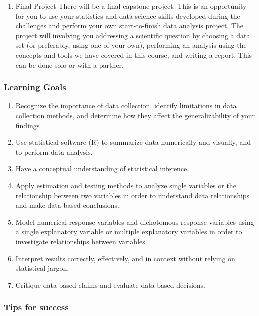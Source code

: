 \documentclass[]{book}
\providecommand{\tightlist}{%
  \setlength{\itemsep}{0pt}\setlength{\parskip}{0pt}}
\theoremstyle{definition}
\theoremstyle{definition}
\theoremstyle{definition}
\theoremstyle{remark}
\begin{document}
\begin{enumerate}
\def\labelenumi{\arabic{enumi}.}
\setcounter{enumi}{3}
\tightlist
\item
  Final Project There will be a final capstone project. This is an
  opportunity for you to use your statistics and data science skills
  developed during the challenges and perform your own start-to-finish
  data analysis project. The project will involving you addressing a
  scientific question by choosing a data set (or preferably, using one
  of your own), performing an analysis using the concepts and tools we
  have covered in this course, and writing a report. This can be done
  solo or with a partner. 
\end{enumerate}

\hypertarget{learning-goals}{%
\subsubsection{Learning Goals}\label{learning-goals}}

\begin{enumerate}
\def\labelenumi{\arabic{enumi}.}
\tightlist
\item
  Recognize the importance of data collection, identify limitations in
  data collection methods, and determine how they affect the
  generalizability of your findings
\item
  Use statistical software (R) to summarize data numerically and
  visually, and to perform data analysis.
\item
  Have a conceptual understanding of statistical inference.
\item
  Apply estimation and testing methods to analyze single variables or
  the relationship between two variables in order to understand data
  relationships and make data-based conclusions.
\item
  Model numerical response variables and dichotomous response variables
  using a single explanatory variable or multiple explanatory variables
  in order to investigate relationships between variables.
\item
  Interpret results correctly, effectively, and in context without
  relying on statistical jargon.
\item
  Critique data-based claims and evaluate data-based decisions. 
\end{enumerate}

\hypertarget{tips-for-success}{%
\subsubsection{Tips for success}\label{tips-for-success}}
\end{document}
